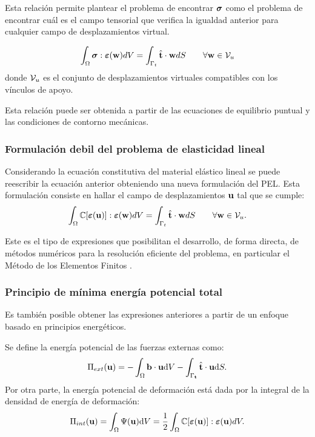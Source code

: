 Esta relación permite plantear el problema de encontrar $\boldsymbol{\sigma}$ como el problema de encontrar cuál es el campo tensorial que verifica la igualdad anterior para cualquier campo de desplazamientos virtual.

\begin{equation}
\int_{\Omega} \boldsymbol{\sigma} : \boldsymbol{\varepsilon} ({\bf w}) dV = \int_{\Gamma_t}  \hat{{\bf t}} \cdot {\bf w} d S \qquad \forall {\bf w} \in {\mathcal V}_{u}
\end{equation}
%
donde ${\mathcal V}_u$ es el conjunto de desplazamientos virtuales compatibles con los vínculos de apoyo.

Esta relación puede ser obtenida a partir de las ecuaciones de equilibrio puntual y las condiciones de contorno mecánicas.

\subsubsection{Formulación debil del problema de elasticidad lineal}

Considerando la ecuación constitutiva del material elástico lineal se puede reescribir la ecuación anterior obteniendo una nueva formulación del PEL. Esta formulación consiste en hallar el campo de desplazamientos ${\bf u}$ tal que se cumple:
%
\begin{equation}
\int_{\Omega} {\mathbb C}[ \boldsymbol{\varepsilon} ({\bf u})] : \boldsymbol{\varepsilon} ({\bf w}) dV = \int_{\Gamma_t}  \hat{{\bf t}} \cdot {\bf w} d S \qquad \forall {\bf w} \in {\mathcal V}_{u}.
\end{equation}

Este es el tipo de expresiones que posibilitan el desarrollo, de forma directa, de métodos numéricos para la resolución eficiente del problema, en particular el Método de los Elementos Finitos \citep{Hughes1987a}.

\subsubsection{Principio de mínima energía potencial total}

Es también posible obtener las expresiones anteriores a partir de un enfoque basado en principios energéticos.

Se define la energía potencial de las fuerzas externas como:
%
\begin{equation}
\Pi_{ext}({\bf u}) = -\int_{\Omega} {\bf b} \cdot {\bf u} {\text{d}} V - \int_{\Gamma_{\bf t}} \hat{ {\bf t}} \cdot {\bf u} {\text{d}} S.
\end{equation}
%
Por otra parte, la energía potencial de deformación está dada por la integral de la densidad de energía de deformación:
%
\begin{equation} \label{eqn:energbarra}
  \Pi_{int}({\bf u}) = \int_{\Omega}
  \Psi ({\bf u}) {\text{d}} V = \frac{1}{2} \int_{\Omega} {\mathbb C}[ \boldsymbol{\varepsilon} ({\bf u})] : \boldsymbol{\varepsilon} ({\bf u}) dV.
\end{equation}


